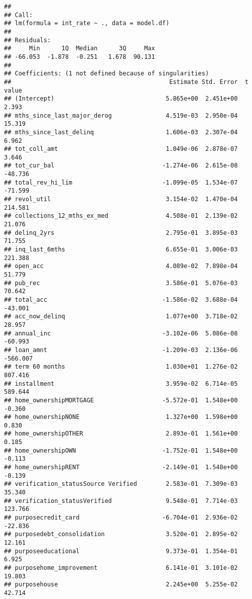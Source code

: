 \documentclass[]{article}
\begin{document}
\begin{verbatim}
## 
## Call:
## lm(formula = int_rate ~ ., data = model.df)
## 
## Residuals:
##     Min      1Q  Median      3Q     Max 
## -66.053  -1.878  -0.251   1.678  90.131 
## 
## Coefficients: (1 not defined because of singularities)
##                                            Estimate Std. Error  t value
## (Intercept)                               5.865e+00  2.451e+00    2.393
## mths_since_last_major_derog               4.519e-03  2.950e-04   15.319
## mths_since_last_delinq                    1.606e-03  2.307e-04    6.962
## tot_coll_amt                              1.049e-06  2.878e-07    3.646
## tot_cur_bal                              -1.274e-06  2.615e-08  -48.736
## total_rev_hi_lim                         -1.099e-05  1.534e-07  -71.599
## revol_util                                3.154e-02  1.470e-04  214.581
## collections_12_mths_ex_med                4.508e-01  2.139e-02   21.076
## delinq_2yrs                               2.795e-01  3.895e-03   71.755
## inq_last_6mths                            6.655e-01  3.006e-03  221.388
## open_acc                                  4.089e-02  7.898e-04   51.779
## pub_rec                                   3.586e-01  5.076e-03   70.642
## total_acc                                -1.586e-02  3.688e-04  -43.001
## acc_now_delinq                            1.077e+00  3.718e-02   28.957
## annual_inc                               -3.102e-06  5.086e-08  -60.993
## loan_amnt                                -1.209e-03  2.136e-06 -566.007
## term 60 months                            1.030e+01  1.276e-02  807.416
## installment                               3.959e-02  6.714e-05  589.644
## home_ownershipMORTGAGE                   -5.572e-01  1.548e+00   -0.360
## home_ownershipNONE                        1.327e+00  1.598e+00    0.830
## home_ownershipOTHER                       2.893e-01  1.561e+00    0.185
## home_ownershipOWN                        -1.752e-01  1.548e+00   -0.113
## home_ownershipRENT                       -2.149e-01  1.548e+00   -0.139
## verification_statusSource Verified        2.583e-01  7.309e-03   35.340
## verification_statusVerified               9.548e-01  7.714e-03  123.766
## purposecredit_card                       -6.704e-01  2.936e-02  -22.836
## purposedebt_consolidation                 3.520e-01  2.895e-02   12.161
## purposeeducational                        9.373e-01  1.354e-01    6.925
## purposehome_improvement                   6.141e-01  3.101e-02   19.803
## purposehouse                              2.245e+00  5.255e-02   42.714

\end{verbatim}
\end{document}
